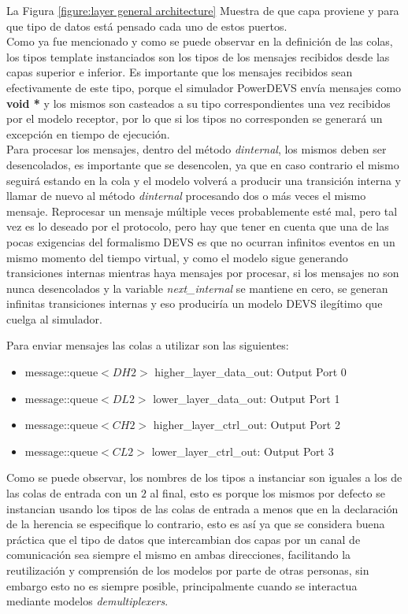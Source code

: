 \documentclass[10pt,a4paper]{article}
\begin{document}
La Figura \ref{figure:layer general architecture} Muestra de que capa proviene y para que tipo de datos está pensado cada uno de estos puertos. \\

Como ya fue mencionado y como se puede observar en la definición de las colas, los tipos template instanciados son los tipos de los mensajes recibidos desde las capas superior e inferior. Es importante que los mensajes recibidos sean efectivamente de este tipo, porque el simulador PowerDEVS envía mensajes como \textbf{void *} y los mismos son casteados a su tipo correspondientes una vez recibidos por el modelo receptor, por lo que si los tipos no corresponden se generará un excepción en tiempo de ejecución. \\

Para procesar los mensajes, dentro del método \textit{dinternal}, los mismos deben ser desencolados, es importante que se desencolen, ya que en caso contrario el mismo seguirá estando en la cola y el modelo volverá a producir una transición interna y llamar de nuevo al método \textit{dinternal} procesando dos o más veces el mismo mensaje. Reprocesar un mensaje múltiple veces probablemente esté mal, pero tal vez es lo deseado por el protocolo, pero hay que tener en cuenta que una de las pocas exigencias del formalismo DEVS es que no ocurran infinitos eventos en un mismo momento del tiempo virtual, y como el modelo sigue generando transiciones internas mientras haya mensajes por procesar, si los mensajes no son nunca desencolados y la variable \textit{next\_internal} se mantiene en cero, se generan infinitas transiciones internas y eso produciría un modelo DEVS ilegítimo que cuelga al simulador. \\

\newpage

Para enviar mensajes las colas a utilizar son las siguientes:
\begin{itemize}
\item message::queue$<DH2>$ higher\_layer\_data\_out: Output Port 0 
\item message::queue$<DL2>$ lower\_layer\_data\_out:  Output Port 1
\item message::queue$<CH2>$ higher\_layer\_ctrl\_out: Output Port 2
\item message::queue$<CL2>$ lower\_layer\_ctrl\_out:  Output Port 3
\end{itemize}

Como se puede observar, los nombres de los tipos a instanciar son iguales a los de las colas de entrada con un $2$ al final, esto es porque los mismos por defecto se instancian usando los tipos de las colas de entrada a menos que en la declaración de la herencia se especifique lo contrario, esto es así ya que se considera buena práctica que el tipo de datos que intercambian dos capas por un canal de comunicación sea siempre el mismo en ambas direcciones, facilitando la reutilización y comprensión de los modelos por parte de otras personas, sin embargo esto no es siempre posible, principalmente cuando se interactua mediante modelos \textit{demultiplexers}. \\
\end{document}
